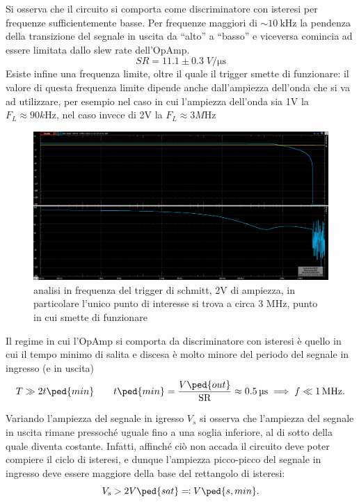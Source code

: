 \documentclass[10pt,a4paper]{article}
\begin{document}
Si osserva che il circuito si comporta come discriminatore con isteresi per
frequenze sufficientemente basse. Per frequenze maggiori di
$\sim\SI{10}{\kilo\hertz}$ la pendenza della transizione del segnale in
uscita da ``alto'' a ``basso'' e viceversa comincia ad essere limitata dallo
slew rate dell'OpAmp.
\[
SR = 11.1 \pm 0.3 \; \si{V/\micro\s}
\]
Esiste infine una frequenza limite, oltre il quale il trigger smette di funzionare: il valore di questa frequenza limite dipende anche dall'ampiezza dell'onda che si va ad utilizzare, per esempio nel caso in cui l'ampiezza dell'onda sia 1V la $F_L \approx 90 \si{k\Hz}$, nel caso invece di 2V la $F_L \approx 3 \si{M\Hz}$
\begin{figure}[htbp]
\centering
\includegraphics[scale=0.4]{bodeschmitt2V100Hz5MHz}
\caption{analisi in frequenza del trigger di schmitt, 2V di ampiezza, in particolare l'unico punto di interesse si trova a circa 3 MHz, punto in cui smette di funzionare}
\end{figure}
Il regime in cui l'OpAmp si comporta da discriminatore con isteresi è quello
in cui il tempo minimo di salita e discesa è molto minore del periodo del
segnale in ingresso (e in uscita)
\begin{equation}\label{eq:slewlimit}
T \gg 2 t \ped{min} \qquad t \ped{min} = \frac{V\ped{out}}{\mathrm{SR}} \approx \SI{0.5}{\micro\second} \implies f \ll \SI{1}{M\hertz}.
  \end{equation}

Variando l'ampiezza del segnale in igresso $V_s$ si osserva che l'ampiezza del
segnale in uscita rimane pressoché uguale fino a una soglia inferiore, al di
sotto della quale diventa costante. 
Infatti, affinché ciò non accada il circuito deve poter compiere il ciclo di
isteresi, e dunque l'ampiezza picco-picco del segnale in ingresso deve essere
maggiore della base del rettangolo di isteresi:
\[ V_s > 2 V \ped{sat} \eqqcolon V\ped{s, min}. \]
\end{document}
